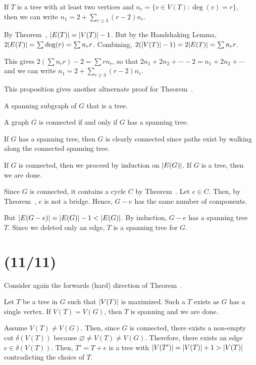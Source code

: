 \begin{prop}
  If $T$ is a tree with at least two vertices
  and $n_r = \{ v \in V(T) : \deg(v) = r \}$, then we can write
  $n_1 = 2 + \sum_{r \geq 3} (r-2) n_r$.
\end{prop}
\begin{prf}
  By Theorem~, $\abs{E(T)} = \abs{V(T)} - 1$.
  But by the Handshaking Lemma, $2\abs{E(T)} = \sum \deg(r) = \sum n_r r$.
  Combining, $2(\abs{V(T)}-1) = 2\abs{E(T)} = \sum n_r r$.

  This gives $2(\sum n_r r) - 2 = \sum r n_r$,
  so that $2n_1 + 2n_2 + \dotsb - 2 = n_1 + 2n_2 + \dotsb$
  and we can write $n_1 = 2 + \sum_{r \geq 3}(r-2)n_r$.
\end{prf}

This proposition gives another altnernate proof for Theorem~.

\begin{defn}
  A spanning subgraph of $G$ that is a tree.
\end{defn}

\begin{theorem}[5.2.1]\label{thm:conspan}
  A graph $G$ is connected if and only if $G$ has a spanning tree.
\end{theorem}
\begin{prf}
  If $G$ has a spanning tree, then $G$ is clearly connected
  since paths exist by walking along the connected spanning tree.

  If $G$ is connected, then we proceed by induction on $\abs{E(G)}$.
  If $G$ is a tree, then we are done.

  Since $G$ is connected, it contains a cycle $C$ by Theorem~.
  Let $e \in C$.
  Then, by Theorem~, $e$ is not a bridge.
  Hence, $G-e$ has the same number of components.

  But $\abs{E(G-e)} = \abs{E(G)} - 1 < \abs{E(G)}$.
  By induction, $G-e$ has a spanning tree $T$.
  Since we deleted only an edge, $T$ is a spanning tree for $G$.
\end{prf}

\section{(11/11)}

Consider again the forwards (hard) direction of Theorem~.

\begin{prf}
  Let $T$ be a tree in $G$ such that $\abs{V(T)}$ is maximized.
  Such a $T$ exists as $G$ has a single vertex.
  If $V(T) = V(G)$, then $T$ is spanning and we are done.

  Assume $V(T) \neq V(G)$.
  Then, since $G$ is connected, there exists a non-empty cut $\delta(V(T))$
  because $\varnothing \neq V(T) \neq V(G)$.
  Therefore, there exists an edge $e \in \delta(V(T))$.
  Then, $T' = T + e$ is a tree with $\abs{V(T')} = \abs{V(T)} + 1 > \abs{V(T)}$
  contradicting the choice of $T$.
\end{prf}

